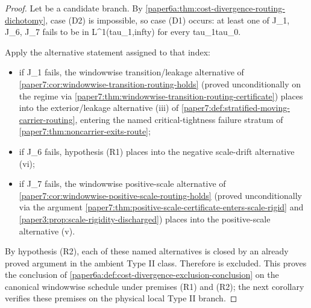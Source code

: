 \documentclass[11pt]{amsart}
\def\({}%
\def\){}%
\def\tau{tau}%
\def\infty{infty}%
\theoremstyle{plain}
\theoremstyle{definition}
\theoremstyle{remark}
\begin{document}
\begin{proof}
Let \(\omega\) be a candidate branch.  By
\cref{paper6a:thm:cost-divergence-routing-dichotomy}, case \textup{(D2)} is
impossible, so case \textup{(D1)} occurs: at least one of
\(J_1\), \(J_6\), \(J_7\) fails to be in \(L^1(\tau_1,\infty)\) for every
\(\tau_1\ge\tau_0\).

Apply the alternative statement assigned to that index:
\begin{itemize}
\item if \(J_1\) fails, the windowwise transition/leakage alternative of
\cref{paper7:cor:windowwise-transition-routing-holds} (proved
unconditionally on the regime via
\cref{paper7:thm:windowwise-transition-routing-certificate}) places
\(\omega\) into the exterior/leakage alternative \textup{(iii)} of
\cref{paper7:def:stratified-moving-carrier-routing}, entering the named
critical-tightness failure stratum of
\cref{paper7:thm:noncarrier-exits-route};
\item if \(J_6\) fails, hypothesis \textup{(R1)} places \(\omega\) into the
negative scale-drift alternative \textup{(vi)};
\item if \(J_7\) fails, the windowwise positive-scale alternative of
\cref{paper7:cor:windowwise-positive-scale-routing-holds} (proved
unconditionally via the argument
\cref{paper7:thm:positive-scale-certificate-enters-scale-rigid} and
\cref{paper3:prop:scale-rigidity-discharged}) places \(\omega\) into the
positive-scale alternative \textup{(v)}.
\end{itemize}
By hypothesis \textup{(R2)}, each of these named alternatives is closed by
an already proved argument in the ambient Type II class.  Therefore
\(\omega\) is excluded.  This proves the conclusion of
\cref{paper6a:def:cost-divergence-exclusion-conclusion} on the canonical windowwise
schedule under premises \textup{(R1)} and \textup{(R2)}; the next corollary
verifies these premises on the physical local Type II branch.
\end{proof}
\end{document}

